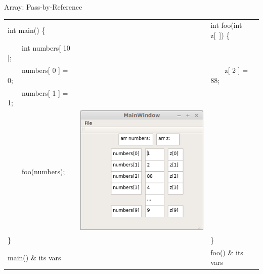 \documentclass[presentation]{beamer}
\begin{document}
\begin{frame}[label=sec-9]{Array: Pass-by-Reference}
\begin{center}
\begin{tabular}{lll}
\hline
int main() \{ &  & int foo(int z[\ ]) \{\\
\ \ \ \ int numbers[ 10 ]; &  & \\
\ \ \ \ numbers[ 0 ] = 0; &  & \ \ \ \ z[ 2 ] = 88;\\
\ \ \ \ numbers[ 1 ] = 1; &  & \\
\ \ \ \ foo(numbers); & \includegraphics[width=.4\linewidth]{./array.png} & \\
\} &  & \}\\
\alert{main() \& its vars} &  & \alert{foo() \& its vars}\\
\hline
\end{tabular}
\end{center}
\end{frame}
\end{document}
